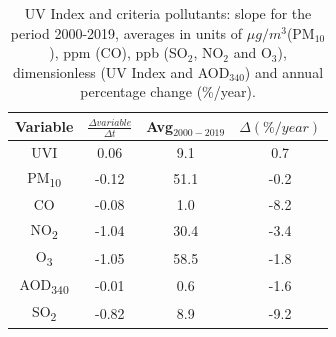 \documentclass[10pt]{article}
\begin{document}
\begin{table}[H]
  \centering
  \begin{tabular}{cccc} \hline
    Variable               & $\frac{\Delta variable}{\Delta t}$ & Avg$_{2000-2019}$ & $\Delta(\%/year)$ \\ \hline
    UVI                    & 0.06                               & 9.1               & 0.7               \\
    PM\textsubscript{10}   & -0.12                              & 51.1              & -0.2              \\
    CO                     & -0.08                              & 1.0               & -8.2              \\
    NO\textsubscript{2}    & -1.04                              & 30.4              & -3.4              \\
    O\textsubscript{3}     & -1.05                              & 58.5              & -1.8              \\
    AOD\textsubscript{340} & -0.01                              & 0.6               & -1.6              \\
    SO\textsubscript{2}    & -0.82                              & 8.9               & -9.2              \\
    \hline
  \end{tabular}
  \caption{{{{UV Index and criteria pollutants: slope for the period 2000-2019, averages in units of $\mu g/m^3$(PM$_{10}$), ppm (CO), ppb (SO$_2$, NO$_2$ and O$_3$), dimensionless (UV Index and AOD$_{340}$) and annual percentage change (\%/year).}}}}
  \label{table:uvindex}
\end{table}
\end{document}
